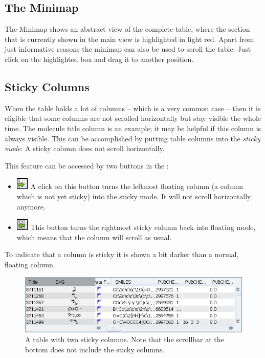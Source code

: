 \subsection{The Minimap}

The Minimap shows an abstract view of the complete table, where the
section that is currently shown in the main view is highlighted in
light red. Apart from just informative reasons the minimap can also
be used to scroll the table. Just click on the highlighted box and
drag it to another position.


\subsection{Sticky Columns}

When the table holds a lot of columns -- which is a very common case
-- then it is eligible that some columns are not scrolled horizontally
but stay visible the whole time. The molecule title column is an example;
it may be helpful if this column is always visible. This can be accomplished
by putting table columns into the \textit{sticky mode}: A sticky column
does not scroll horizontally. 

This feature can be accessed by two buttons in the \tbar:
\begin{itemize}
\item \includegraphics{images/table/table_sticky_add} A
click on this button turns the leftmost floating column (a column
which is not yet sticky) into the sticky mode. It will not scroll
horizontally anymore.
\item \includegraphics{images/table/table_sticky_remove} This
button turns the rightmost sticky column back into floating mode,
which means that the column will scroll as usual.
\end{itemize}
To indicate that a column is sticky it is shown a bit darker than
a normal, floating column.

%
\begin{figure}[!htb]
\begin{centering}
\includegraphics[width=0.8\columnwidth]{images/table/table_sticky_example}
\par\end{centering}

\caption[Sticky columns]{A table with two sticky columns. Note that the scrollbar at the bottom
does not include the sticky columns.}


%
\end{figure}



